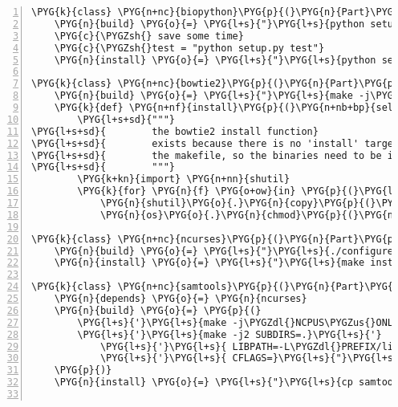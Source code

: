 \begin{Verbatim}[commandchars=\\\{\},numbers=left,firstnumber=1,stepnumber=5]
\PYG{k}{class} \PYG{n+nc}{biopython}\PYG{p}{(}\PYG{n}{Part}\PYG{p}{)}\PYG{p}{:}
    \PYG{n}{build} \PYG{o}{=} \PYG{l+s}{"}\PYG{l+s}{python setup.py build}\PYG{l+s}{"}
    \PYG{c}{\PYGZsh{} save some time}
    \PYG{c}{\PYGZsh{}test = "python setup.py test"}
    \PYG{n}{install} \PYG{o}{=} \PYG{l+s}{"}\PYG{l+s}{python setup.py install --prefix=\PYGZdl{}PREFIX}\PYG{l+s}{"}

\PYG{k}{class} \PYG{n+nc}{bowtie2}\PYG{p}{(}\PYG{n}{Part}\PYG{p}{)}\PYG{p}{:}
    \PYG{n}{build} \PYG{o}{=} \PYG{l+s}{"}\PYG{l+s}{make -j\PYGZdl{}NCPUS\PYGZus{}ONLN}\PYG{l+s}{"}
    \PYG{k}{def} \PYG{n+nf}{install}\PYG{p}{(}\PYG{n+nb+bp}{self}\PYG{p}{)}\PYG{p}{:}
        \PYG{l+s+sd}{"""}
\PYG{l+s+sd}{        the bowtie2 install function}
\PYG{l+s+sd}{        exists because there is no 'install' target in}
\PYG{l+s+sd}{        the makefile, so the binaries need to be installed manually}
\PYG{l+s+sd}{        """}
        \PYG{k+kn}{import} \PYG{n+nn}{shutil}
        \PYG{k}{for} \PYG{n}{f} \PYG{o+ow}{in} \PYG{p}{(}\PYG{l+s}{"}\PYG{l+s}{bowtie2}\PYG{l+s}{"} \PYG{o}{+} \PYG{n}{x} \PYG{k}{for} \PYG{n}{x} \PYG{o+ow}{in} \PYG{p}{(}\PYG{l+s}{"}\PYG{l+s}{"}\PYG{p}{,} \PYG{l+s}{"}\PYG{l+s}{-align}\PYG{l+s}{"}\PYG{p}{,} \PYG{l+s}{"}\PYG{l+s}{-build}\PYG{l+s}{"}\PYG{p}{,} \PYG{l+s}{"}\PYG{l+s}{-inspect}\PYG{l+s}{"}\PYG{p}{)}\PYG{p}{)}\PYG{p}{:}
            \PYG{n}{shutil}\PYG{o}{.}\PYG{n}{copy}\PYG{p}{(}\PYG{n}{f}\PYG{p}{,} \PYG{n}{env}\PYG{p}{[}\PYG{l+s}{"}\PYG{l+s}{BINDIR}\PYG{l+s}{"}\PYG{p}{]}\PYG{p}{)}
            \PYG{n}{os}\PYG{o}{.}\PYG{n}{chmod}\PYG{p}{(}\PYG{n}{env}\PYG{p}{[}\PYG{l+s}{"}\PYG{l+s}{BINDIR}\PYG{l+s}{"}\PYG{p}{]} \PYG{o}{+} \PYG{l+s}{"}\PYG{l+s}{/}\PYG{l+s}{"} \PYG{o}{+} \PYG{n}{f}\PYG{p}{,} \PYG{l+m+mo}{0775}\PYG{p}{)}

\PYG{k}{class} \PYG{n+nc}{ncurses}\PYG{p}{(}\PYG{n}{Part}\PYG{p}{)}\PYG{p}{:}
    \PYG{n}{build} \PYG{o}{=} \PYG{l+s}{"}\PYG{l+s}{./configure --prefix \PYGZdl{}HOME/.local \&\& make}\PYG{l+s}{"}
    \PYG{n}{install} \PYG{o}{=} \PYG{l+s}{"}\PYG{l+s}{make install}\PYG{l+s}{"}

\PYG{k}{class} \PYG{n+nc}{samtools}\PYG{p}{(}\PYG{n}{Part}\PYG{p}{)}\PYG{p}{:}
    \PYG{n}{depends} \PYG{o}{=} \PYG{n}{ncurses}
    \PYG{n}{build} \PYG{o}{=} \PYG{p}{(}
        \PYG{l+s}{'}\PYG{l+s}{make -j\PYGZdl{}NCPUS\PYGZus{}ONLN -C bcftools}\PYG{l+s}{'}\PYG{p}{,}
        \PYG{l+s}{'}\PYG{l+s}{make -j2 SUBDIRS=.}\PYG{l+s}{'}
            \PYG{l+s}{'}\PYG{l+s}{ LIBPATH=-L\PYGZdl{}PREFIX/lib LIBCURSES=-lncurses}\PYG{l+s}{'}
            \PYG{l+s}{'}\PYG{l+s}{ CFLAGS=}\PYG{l+s}{"}\PYG{l+s}{\PYGZdl{}(echo -I\PYGZdl{}PREFIX/include\PYGZob{},/ncurses\PYGZcb{})}\PYG{l+s}{"}\PYG{l+s}{'}
    \PYG{p}{)}
    \PYG{n}{install} \PYG{o}{=} \PYG{l+s}{"}\PYG{l+s}{cp samtools \PYGZdl{}PREFIX/bin}\PYG{l+s}{"}


\end{Verbatim}
